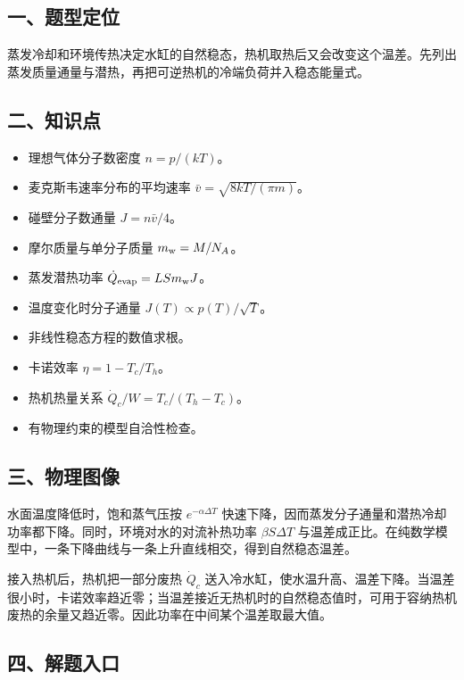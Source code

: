 \documentclass[12pt,a4paper,UTF8]{ctexart}
\newcommand{\tightlist}{\setlength{\itemsep}{0pt}\setlength{\parskip}{0pt}}
\begin{document}
\subsection{一、题型定位}\label{ux4e00ux9898ux578bux5b9aux4f4d-6}

蒸发冷却和环境传热决定水缸的自然稳态，热机取热后又会改变这个温差。先列出蒸发质量通量与潜热，再把可逆热机的冷端负荷并入稳态能量式。

\subsection{二、知识点}\label{ux4e8cux77e5ux8bc6ux70b9-6}

\begin{itemize}
\tightlist
\item
  理想气体分子数密度 \(n=p/(kT)\)。
\item
  麦克斯韦速率分布的平均速率 \(\bar v=\sqrt{8kT/(\pi m)}\)。
\item
  碰壁分子数通量 \(J=n\bar v/4\)。
\item
  摩尔质量与单分子质量 \(m_{\rm w}=M/N_A\)。
\item
  蒸发潜热功率 \(\dot Q_{\rm evap}=LSm_{\rm w}J\)。
\item
  温度变化时分子通量 \(J(T)\propto p(T)/\sqrt T\)。
\item
  非线性稳态方程的数值求根。
\item
  卡诺效率 \(\eta=1-T_c/T_h\)。
\item
  热机热量关系 \(\dot Q_c/W=T_c/(T_h-T_c)\)。
\item
  有物理约束的模型自洽性检查。
\end{itemize}

\subsection{三、物理图像}\label{ux4e09ux7269ux7406ux56feux50cf-6}

水面温度降低时，饱和蒸气压按 \(e^{-\alpha\Delta T}\)
快速下降，因而蒸发分子通量和潜热冷却功率都下降。同时，环境对水的对流补热功率
\(\beta S\Delta T\)
与温差成正比。在纯数学模型中，一条下降曲线与一条上升直线相交，得到自然稳态温差。

接入热机后，热机把一部分废热 \(\dot Q_c\)
送入冷水缸，使水温升高、温差下降。当温差很小时，卡诺效率趋近零；当温差接近无热机时的自然稳态值时，可用于容纳热机废热的余量又趋近零。因此功率在中间某个温差取最大值。

\subsection{四、解题入口}\label{ux56dbux89e3ux9898ux5165ux53e3-6}
\end{document}
